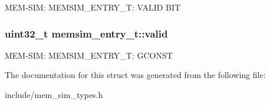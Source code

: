 M\-E\-M-\/\-S\-I\-M\-: M\-E\-M\-S\-I\-M\-\_\-\-E\-N\-T\-R\-Y\-\_\-\-T\-: V\-A\-L\-I\-D B\-I\-T \hypertarget{structmemsim__entry__t_a0c0fd08ced6d9c59b1c2806186ac6dc2}{
\subsubsection[{valid}]{\setlength{\rightskip}{0pt plus 5cm}uint32\-\_\-t memsim\-\_\-entry\-\_\-t\-::valid}}\label{structmemsim__entry__t_a0c0fd08ced6d9c59b1c2806186ac6dc2}
M\-E\-M-\/\-S\-I\-M\-: M\-E\-M\-S\-I\-M\-\_\-\-E\-N\-T\-R\-Y\-\_\-\-T\-: G\-C\-O\-N\-S\-T 

The documentation for this struct was generated from the following file\-:\begin{DoxyCompactItemize}
\item 
include/mem\-\_\-sim\-\_\-types.\-h\end{DoxyCompactItemize}
